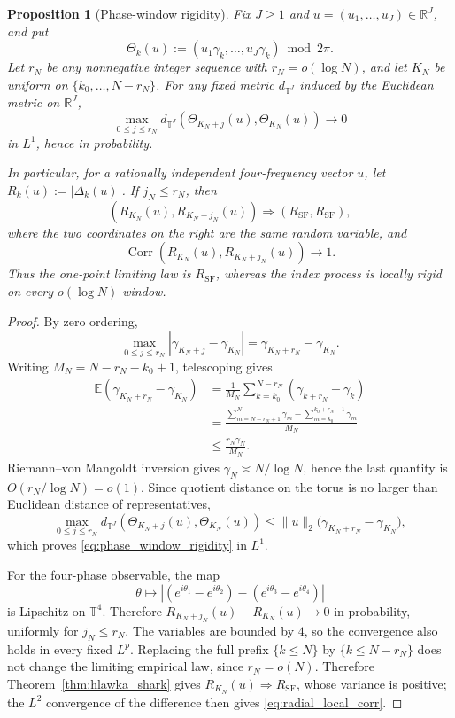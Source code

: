 \documentclass[pdflatex,sn-mathphys-num]{sn-jnl}
\numberwithin{equation}{section}
\theoremstyle{thmstyleone}
\newtheorem{proposition}[theorem]{Proposition}
\theoremstyle{thmstylethree}
\theoremstyle{thmstyletwo}
\newcommand{\R}{\mathbb R}
\newcommand{\Torus}{\mathbb T}
\newcommand{\E}{\mathbb E}
\newcommand{\Corr}{\operatorname{Corr}}
\newcommand{\RSF}{R_{\mathrm{SF}}}
\newcommand{\1}{\mathbf 1}
\begin{document}
\begin{proposition}[Phase-window rigidity]
\label{prop:phase_window_rigidity}
Fix \(J\ge1\) and \(u=(u_1,\ldots,u_J)\in\R^J\), and put
\[
 \Theta_k(u):=(u_1\gamma_k,\ldots,u_J\gamma_k)\bmod2\pi.
\]
Let \(r_N\) be any nonnegative integer sequence with \(r_N=o(\log N)\), and let
\(K_N\) be uniform on \(\{k_0,\ldots,N-r_N\}\).  For any fixed metric
\(d_{\Torus^J}\) induced by the Euclidean metric on \(\R^J\),
\begin{equation}
 \max_{0\le j\le r_N}
 d_{\Torus^J}\!\left(\Theta_{K_N+j}(u),\Theta_{K_N}(u)\right)
 \longrightarrow0
\label{eq:phase_window_rigidity}
\end{equation}
in \(L^1\), hence in probability.

In particular, for a rationally independent four-frequency vector \(u\), let
\(R_k(u):=|\Delta_k(u)|\).  If \(j_N\le r_N\), then
\[
 (R_{K_N}(u),R_{K_N+j_N}(u))
 \Longrightarrow
 (\RSF,\RSF),
\]
where the two coordinates on the right are the same random variable, and
\begin{equation}
 \Corr(R_{K_N}(u),R_{K_N+j_N}(u))\longrightarrow1.
\label{eq:radial_local_corr}
\end{equation}
Thus the one-point limiting law is $\RSF$, whereas the index process is
locally rigid on every \(o(\log N)\) window.
\end{proposition}

\begin{proof}
By zero ordering,
\[
 \max_{0\le j\le r_N}
 |\gamma_{K_N+j}-\gamma_{K_N}|
 =
 \gamma_{K_N+r_N}-\gamma_{K_N}.
\]
Writing \(M_N=N-r_N-k_0+1\), telescoping gives
\begin{align*}
 \E\!\left(\gamma_{K_N+r_N}-\gamma_{K_N}\right)
 &=
 \frac1{M_N}
 \sum_{k=k_0}^{N-r_N}(\gamma_{k+r_N}-\gamma_k)\\
 &=
 \frac{
 \sum_{m=N-r_N+1}^{N}\gamma_m
 -
 \sum_{m=k_0}^{k_0+r_N-1}\gamma_m
 }{M_N}\\
 &\le
 \frac{r_N\gamma_N}{M_N}.
\end{align*}
Riemann--von Mangoldt inversion gives \(\gamma_N\asymp N/\log N\), hence the last
quantity is \(O(r_N/\log N)=o(1)\).  Since quotient distance on the torus is no
larger than Euclidean distance of representatives,
\[
 \max_{0\le j\le r_N}
 d_{\Torus^J}\!\left(\Theta_{K_N+j}(u),\Theta_{K_N}(u)\right)
 \le
 \|u\|_2\bigl(\gamma_{K_N+r_N}-\gamma_{K_N}\bigr),
\]
which proves \eqref{eq:phase_window_rigidity} in \(L^1\).

For the four-phase observable, the map
\[
 \theta\longmapsto
 \left|
 (e^{i\theta_1}-e^{i\theta_2})
 -(e^{i\theta_3}-e^{i\theta_4})
 \right|
\]
is Lipschitz on \(\Torus^4\).  Therefore
\(R_{K_N+j_N}(u)-R_{K_N}(u)\to0\) in probability, uniformly for
\(j_N\le r_N\).  The variables are bounded by \(4\), so the convergence also holds
in every fixed \(L^p\).  Replacing the full prefix $\{k\le N\}$ by $\{k\le N-r_N\}$ does
not change the limiting empirical law, since $r_N=o(N)$.  Therefore
Theorem~\ref{thm:hlawka_shark} gives
\(R_{K_N}(u)\Rightarrow\RSF\), whose variance is positive; the \(L^2\) convergence
of the difference then gives \eqref{eq:radial_local_corr}.
\end{proof}
\end{document}
